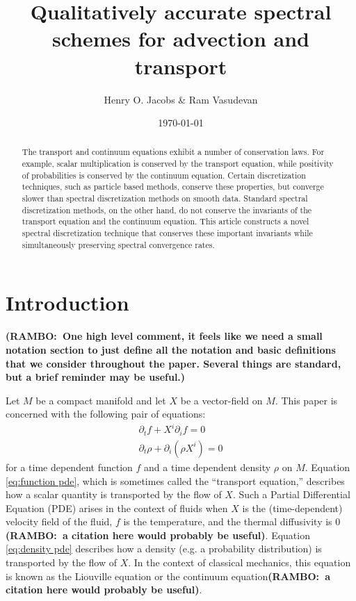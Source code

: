 \documentclass[final,leqno]{siamltex1213}
\title{Qualitatively accurate spectral schemes for advection and transport}
\author{Henry O. Jacobs \& Ram Vasudevan}
\date{\today}
\newcommand{\ram}[1]{{\normalsize{\textbf{({\color{red}RAMBO:\ }#1)}}}}
\begin{document}
\maketitle

\begin{abstract}
	The transport and continuum equations exhibit a number of conservation laws.
	For example, scalar multiplication is conserved by the transport equation, while
	positivity of probabilities is conserved by the continuum equation.
	Certain discretization techniques, such as particle based methods, conserve these properties, but converge slower than spectral discretization methods on smooth data.
	Standard spectral discretization methods, on the other hand, do not conserve the invariants of the transport equation and the continuum equation.
	This article constructs a novel spectral discretization technique that conserves these important invariants while simultaneously preserving spectral convergence rates. 
\end{abstract}

\section{Introduction}
\label{sec:intro}

\ram{One high level comment, it feels like we need a small notation section to just define all the notation and basic definitions that we consider throughout the paper. Several things are standard, but a brief reminder may be useful.}

Let $M$ be a compact manifold and let $X$ be a vector-field on $M$. 
This paper is concerned with the following pair of equations:
\begin{align}
	\partial_{t} f + X^{i} \partial_{i} f = 0 \label{eq:function pde} \\
	\partial_{t} \rho + \partial_{i} (\rho X^{i}) = 0 \label{eq:density pde}
\end{align}
for a time dependent function $f$ and a time dependent density $\rho$ on $M$.
Equation \eqref{eq:function pde}, which is sometimes called the ``transport equation,'' describes how a scalar quantity is transported by the flow of $X$.
Such a Partial Differential Equation (PDE) arises in the context of fluids when $X$ is the (time-dependent) velocity field of the fluid, $f$ is the temperature, and the thermal diffusivity is $0$ \ram{a citation here would probably be useful}.
Equation \eqref{eq:density pde} describes how a density (e.g. a probability distribution) is transported by the flow of $X$.
In the context of classical mechanics, this equation is known as the Liouville equation or the continuum equation\ram{a citation here would probably be useful}.
\end{document}
